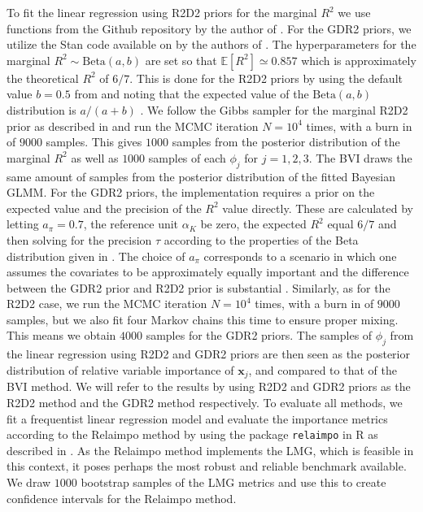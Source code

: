 \noindent To fit the linear regression using R2D2 priors for the marginal $R^2$ we use functions from the Github repository \citet{zhang2024r2d2_git} by the author of \citet{zhang2020bayesian}. For the GDR2 priors, we utilize the Stan code available on \citet{aguilar2024GDR_code} by the authors of \citet{aguilar2024generalized}. The hyperparameters for the marginal $R^2 \sim \text{Beta}(a, b)$ are set so that $\mathbb{E}[R^2] \simeq 0.857$ which is approximately the theoretical $R^2$ of $6/7$. This is done for the R2D2 priors by using the default value $b=0.5$ from \citet{zhang2024r2d2_git} and noting that the expected value of the $\text{Beta}(a, b)$ distribution is $a/(a+b)$ \citep{stats_book}. We follow the Gibbs sampler for the marginal R2D2 prior as described in \citep[section 5.3]{zhang2020bayesian} and run the MCMC iteration $N=10^4$ times, with a burn in of $9000$ samples. This gives $1000$ samples from the posterior distribution of the marginal $R^2$ as well as $1000$ samples of each $\phi_j$ for $j=1, 2, 3$. The BVI draws the same amount of samples from the posterior distribution of the fitted Bayesian GLMM.
For the GDR2 priors, the implementation requires a prior on the expected value and the precision of the $R^2$ value directly. These are calculated by letting $a_{\pi}=0.7$, the reference unit $\alpha_K$ be zero, the expected $R^2$ equal $6/7$ and then solving for the precision $\tau$ according to the properties of the Beta distribution given in \citet{aguilar2024generalized}. The choice of $a_{\pi}$ corresponds to a scenario in which one assumes the covariates to be approximately equally important and the difference between the GDR2 prior and R2D2 prior is substantial \citep{aguilar2024generalized}. Similarly, as for the R2D2 case, we run the MCMC iteration $N=10^4$ times, with a burn in of $9000$ samples, but we also fit four Markov chains this time to ensure proper mixing. This means we obtain $4000$ samples for the GDR2 priors. The samples of $\phi_j$ from the linear regression using R2D2 and GDR2 priors are then seen as the posterior distribution of relative variable importance of $\mathbf{x}_j$, and compared to that of the BVI method. We will refer to the results by using R2D2 and GDR2 priors as the R2D2 method and the GDR2 method respectively. To evaluate all methods, we fit a frequentist linear regression model and evaluate the importance metrics according to the Relaimpo method by using the package \texttt{relaimpo} \citep{groemping2023relaimpo} in R as described in \citet{gromping_relaimpo}. As the Relaimpo method implements the LMG, which is feasible in this context, it poses perhaps the most robust and reliable benchmark available. We draw $1000$ bootstrap samples of the LMG metrics and use this to create confidence intervals for the Relaimpo method. 



